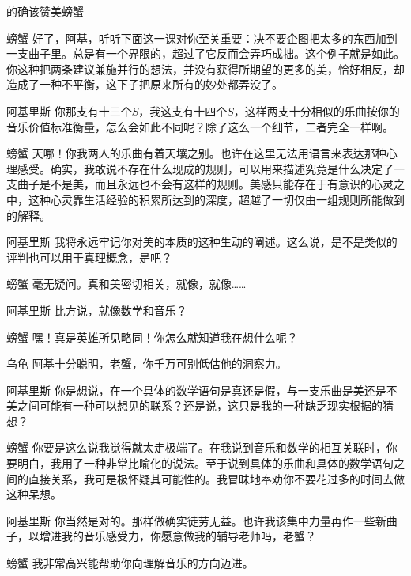 \begin{dialog}{的确该赞美螃蟹}
\begin{dialogue}
\item[螃蟹]好了，阿基，听听下面这一课对你至关重要：决不要企图把太多的东西加到一支曲子里。总是有一个界限的，超过了它反而会弄巧成拙。这个例子就是如此。你这种把两条建议兼施并行的想法，并没有获得所期望的更多的美，恰好相反，却造成了一种不平衡，这下子把原来所有的妙处都弄没了。

\item[阿基里斯]你那支有十三个$S$，我这支有十四个$S$，这样两支十分相似的乐曲按你的音乐价值标准衡量，怎么会如此不同呢？除了这么一个细节，二者完全一样啊。

\item[螃蟹]天哪！你我两人的乐曲有着天壤之别。也许在这里无法用语言来表达那种心理感受。确实，我敢说不存在什么现成的规则，可以用来描述究竟是什么决定了一支曲子是不是美，而且永远也不会有这样的规则。美感只能存在于有意识的心灵之中，这种心灵靠生活经验的积累所达到的深度，超越了一切仅由一组规则所能做到的解释。

\item[阿基里斯]我将永远牢记你对美的本质的这种生动的阐述。这么说，是不是类似的评判也可以用于真理概念，是吧？

\item[螃蟹]毫无疑问。真和美密切相关，就像，就像……

\item[阿基里斯]比方说，就像数学和音乐？

\item[螃蟹]嘿！真是英雄所见略同！你怎么就知道我在想什么呢？

\item[乌龟]阿基十分聪明，老蟹，你千万可别低估他的洞察力。

\item[阿基里斯]你是想说，在一个具体的数学语句是真还是假，与一支乐曲是美还是不美之间可能有一种可以想见的联系？还是说，这只是我的一种缺乏现实根据的猜想？

\item[螃蟹]你要是这么说我觉得就太走极端了。在我说到音乐和数学的相互关联时，你要明白，我用了一种非常比喻化的说法。至于说到具体的乐曲和具体的数学语句之间的直接关系，我可是极怀疑其可能性的。我冒昧地奉劝你不要花过多的时间去做这种呆想。

\item[阿基里斯]你当然是对的。那样做确实徒劳无益。也许我该集中力量再作一些新曲子，以增进我的音乐感受力，你愿意做我的辅导老师吗，老蟹？

\item[螃蟹]我非常高兴能帮助你向理解音乐的方向迈进。


\end{dialogue}
\end{dialog}
